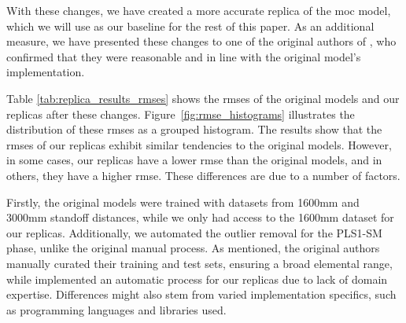 With these changes, we have created a more accurate replica of the \gls{moc} model, which we will use as our baseline for the rest of this paper.
As an additional measure, we have presented these changes to one of the original authors of \citet{cleggRecalibrationMarsScience2017}, who confirmed that they were reasonable and in line with the original model's implementation.

Table \ref{tab:replica_results_rmses} shows the \gls{rmse}s of the original models and our replicas after these changes.
Figure~\ref{fig:rmse_histograms} illustrates the distribution of these \gls{rmse}s as a grouped histogram.
The results show that the \gls{rmse}s of our replicas exhibit similar tendencies to the original models.
However, in some cases, our replicas have a lower \gls{rmse} than the original models, and in others, they have a higher \gls{rmse}.
These differences are due to a number of factors.

Firstly, the original models were trained with datasets from 1600mm and 3000mm standoff distances, while we only had access to the 1600mm dataset for our replicas.
Additionally, we automated the outlier removal for the PLS1-SM phase, unlike the original manual process.
As mentioned, the original authors manually curated their training and test sets, ensuring a broad elemental range, while implemented an automatic process for our replicas due to lack of domain expertise.
Differences might also stem from varied implementation specifics, such as programming languages and libraries used.

